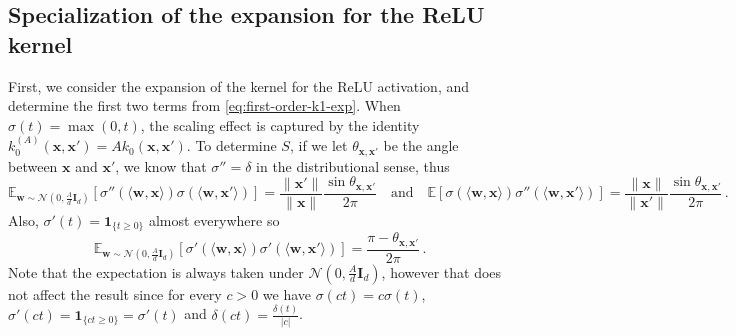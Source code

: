 \subsection{Specialization of the expansion for the ReLU kernel}
First, we consider the expansion of the kernel for the ReLU activation, and determine the first two terms from \cref{eq:first-order-k1-exp}.
When $\sigma(t) = \max(0, t)$, the scaling effect is captured by the identity $k_0^{(A)}(\bm x, \bm x') = A k_0(\bm x, \bm x')$. To determine $S$, if we let $\theta_{\bm x, \bm x'}$ be the angle between $\bm x$ and $\bm x'$, we know that $\sigma'' = \delta$ in the distributional sense, thus
\[
    \mathbb E_{\bm w \sim \mathcal N(0, \frac{A}{d}\bm I_d)}[\sigma''(\langle \bm w, \bm x\rangle)\sigma(\langle \bm w, \bm x'\rangle)] = \frac{\|\bm x'\|}{\|\bm x\|}\frac{\sin \theta_{\bm x, \bm x'}}{2\pi} \quad \text{and} \quad \mathbb E[\sigma(\langle \bm w, \bm x\rangle)\sigma''(\langle \bm w, \bm x'\rangle)] = \frac{\|\bm x\|}{\|\bm x'\|}\frac{\sin \theta_{\bm x, \bm x'}}{2\pi}\, .
\]
Also, $\sigma'(t) = \bm 1_{\{t\geq 0\}}$ almost everywhere so 
\[
    \mathbb E_{\bm w \sim \mathcal N(0, \frac{A}{d}\bm I_d)}[\sigma'(\langle \bm w, \bm x\rangle)\sigma'(\langle \bm w, \bm x'\rangle)] = \frac{\pi - \theta_{\bm x, \bm x'}}{2\pi}\, .
\]
Note that the expectation is always taken under $\mathcal N(0, \frac{A}{d}\bm I_d)$, however that does not affect the result since for every $c > 0$ we have $\sigma(ct) = c \sigma(t)$, $ \sigma'(ct) = \bm 1_{\{ct \geq 0\}} = \sigma'(t) $ and $\delta(ct) = \frac{\delta(t)}{|c|}$.

